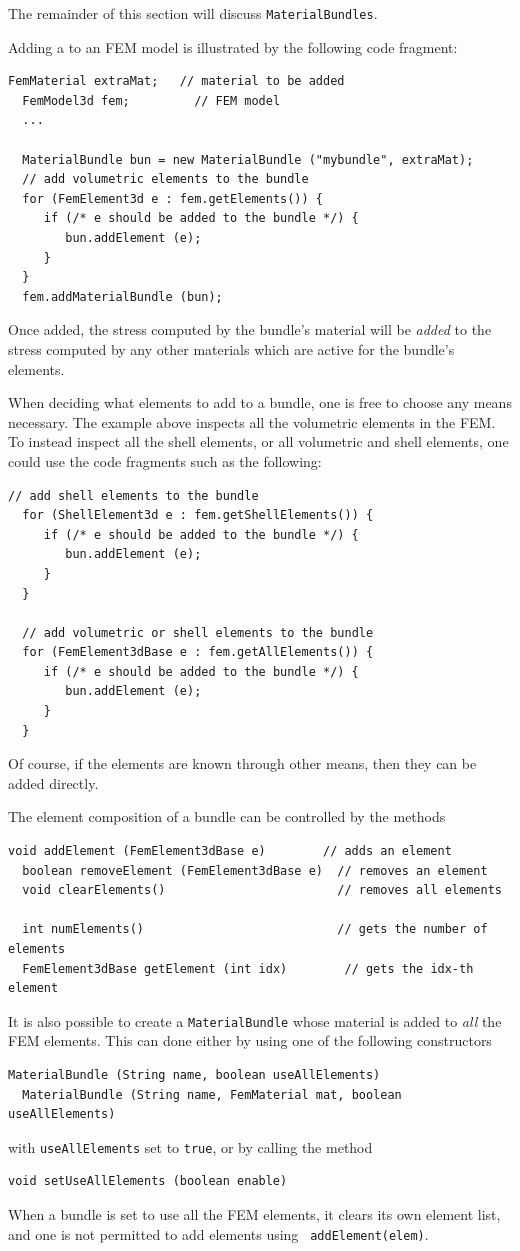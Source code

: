 The remainder of this section will discuss {\tt MaterialBundles}.

Adding a  to
an FEM model is illustrated by the following code fragment:
%
\begin{lstlisting}[]
  FemMaterial extraMat;   // material to be added
  FemModel3d fem;         // FEM model
  ...
  
  MaterialBundle bun = new MaterialBundle ("mybundle", extraMat);
  // add volumetric elements to the bundle
  for (FemElement3d e : fem.getElements()) {
     if (/* e should be added to the bundle */) {
        bun.addElement (e);
     }
  }
  fem.addMaterialBundle (bun);  
\end{lstlisting}
%
Once added, the stress computed by the bundle's material will be {\it
added} to the stress computed by any other materials which are active
for the bundle's elements.

When deciding what elements to add to a bundle, one is free to choose
any means necessary. The example above inspects all the volumetric
elements in the FEM. To instead inspect all the shell elements, or all
volumetric and shell elements, one could use the code
fragments such as the following:
%
\begin{lstlisting}[]
  // add shell elements to the bundle
  for (ShellElement3d e : fem.getShellElements()) {
     if (/* e should be added to the bundle */) {
        bun.addElement (e);
     }
  }

  // add volumetric or shell elements to the bundle
  for (FemElement3dBase e : fem.getAllElements()) {
     if (/* e should be added to the bundle */) {
        bun.addElement (e);
     }
  }
\end{lstlisting}
%
Of course, if the elements are known through other means, then they
can be added directly.

The element composition of a bundle can be controlled by the methods
%
\begin{lstlisting}[]
  void addElement (FemElement3dBase e)        // adds an element
  boolean removeElement (FemElement3dBase e)  // removes an element
  void clearElements()                        // removes all elements

  int numElements()                           // gets the number of elements
  FemElement3dBase getElement (int idx)        // gets the idx-th element 
\end{lstlisting}
%

It is also possible to create a {\tt MaterialBundle} whose material is
added to {\it all} the FEM elements. This can done either by using one
of the following constructors
%
\begin{lstlisting}[]
  MaterialBundle (String name, boolean useAllElements)
  MaterialBundle (String name, FemMaterial mat, boolean useAllElements)
\end{lstlisting}
%
with {\tt useAllElements} set to {\tt true}, or
by calling the method
%
\begin{lstlisting}[]
  void setUseAllElements (boolean enable)
\end{lstlisting}
%
When a bundle is set to use all the FEM elements, it clears its own
element list, and one is not permitted to add elements using {\tt
addElement(elem)}.

